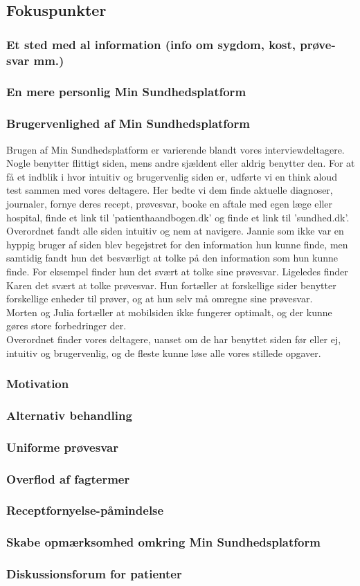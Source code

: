 \subsection{Fokuspunkter}
\subsubsection{Et sted med al information (info om sygdom, kost, prøve-svar mm.)}
\subsubsection{En mere personlig Min Sundhedsplatform}
\subsubsection{Brugervenlighed af Min Sundhedsplatform}
Brugen af Min Sundhedsplatform er varierende blandt vores interviewdeltagere. Nogle benytter flittigt siden, mens andre sjældent eller aldrig benytter den. For at få et indblik i hvor intuitiv og brugervenlig siden er, udførte vi en think aloud test sammen med vores deltagere. Her bedte vi dem finde aktuelle diagnoser, journaler, fornye deres recept, prøvesvar, booke en aftale med egen læge eller hospital, finde et link til 'patienthaandbogen.dk' og finde et link til 'sundhed.dk'. Overordnet fandt alle siden intuitiv og nem at navigere. Jannie som ikke var en hyppig bruger af siden blev begejstret for den information hun kunne finde, men samtidig fandt hun det besværligt at tolke på den information som hun kunne finde. For eksempel finder hun det svært at tolke sine prøvesvar. Ligeledes finder Karen det svært at tolke prøvesvar. Hun fortæller at forskellige sider benytter forskellige enheder til prøver, og at hun selv må omregne sine prøvesvar.\\
Morten og Julia fortæller at mobilsiden ikke fungerer optimalt, og der kunne gøres store forbedringer der.\\
Overordnet finder vores deltagere, uanset om de har benyttet siden før eller ej, intuitiv og brugervenlig, og de fleste kunne løse alle vores stillede opgaver.
\subsubsection{Motivation}
\subsubsection{Alternativ behandling}
\subsubsection{Uniforme prøvesvar}
\subsubsection{Overflod af fagtermer}
\subsubsection{Receptfornyelse-påmindelse}
\subsubsection{Skabe opmærksomhed omkring Min Sundhedsplatform}
\subsubsection{Diskussionsforum for patienter}



